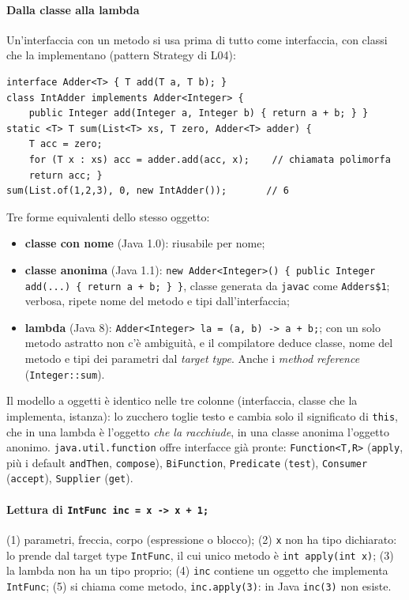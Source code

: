 \documentclass[a4paper,12pt]{article}
\begin{document}
\paragraph{Dalla classe alla lambda} Un'interfaccia con un metodo si usa prima di tutto come
interfaccia, con classi che la implementano (pattern Strategy di L04):
\begin{verbatim}
interface Adder<T> { T add(T a, T b); }
class IntAdder implements Adder<Integer> {
    public Integer add(Integer a, Integer b) { return a + b; } }
static <T> T sum(List<T> xs, T zero, Adder<T> adder) {
    T acc = zero;
    for (T x : xs) acc = adder.add(acc, x);    // chiamata polimorfa
    return acc; }
sum(List.of(1,2,3), 0, new IntAdder());       // 6
\end{verbatim}
Tre forme equivalenti dello stesso oggetto:
\begin{itemize}[nosep]
  \item \textbf{classe con nome} (Java 1.0): riusabile per nome;
  \item \textbf{classe anonima} (Java 1.1): \texttt{new Adder<Integer>() \{ public Integer
        add(...) \{ return a + b; \} \}}, classe generata da \texttt{javac} come
        \texttt{Adders\$1}; verbosa, ripete nome del metodo e tipi dall'interfaccia;
  \item \textbf{lambda} (Java 8): \texttt{Adder<Integer> la = (a, b) -> a + b;}; con un solo
        metodo astratto non c'è ambiguità, e il compilatore deduce classe, nome del metodo e
        tipi dei parametri dal \emph{target type}. Anche i \emph{method reference}
        (\texttt{Integer::sum}).
\end{itemize}
Il modello a oggetti è identico nelle tre colonne (interfaccia, classe che la implementa,
istanza): lo zucchero toglie testo e cambia solo il significato di \texttt{this}, che in una
lambda è l'oggetto \emph{che la racchiude}, in una classe anonima l'oggetto anonimo.
\texttt{java.util.function} offre interfacce già pronte: \texttt{Function<T,R>} (\texttt{apply},
più i default \texttt{andThen}, \texttt{compose}), \texttt{BiFunction}, \texttt{Predicate}
(\texttt{test}), \texttt{Consumer} (\texttt{accept}), \texttt{Supplier} (\texttt{get}).

\paragraph{Lettura di \texttt{IntFunc inc = x -> x + 1;}} (1) parametri, freccia, corpo (espressione
o blocco); (2) \texttt{x} non ha tipo dichiarato: lo prende dal target type \texttt{IntFunc}, il cui
unico metodo è \texttt{int apply(int x)}; (3) la lambda non ha un tipo proprio; (4)
\texttt{inc} contiene un oggetto che implementa \texttt{IntFunc}; (5) si chiama come metodo,
\texttt{inc.apply(3)}: in Java \texttt{inc(3)} non esiste.
\end{document}
